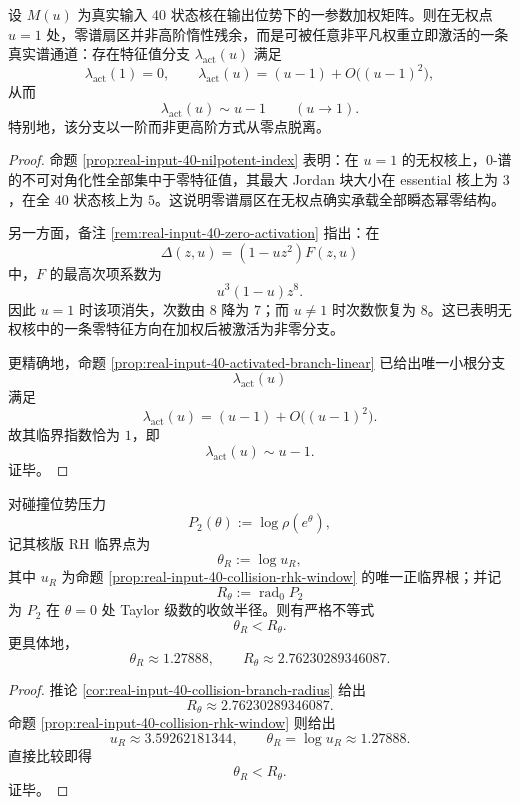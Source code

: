 \begin{theorem}[零谱扇区的一阶激活律]\label{thm:xi-time-part9zm-zero-sector-first-order-activation}
设 \(M(u)\) 为真实输入 \(40\) 状态核在输出位势下的一参数加权矩阵。则在无权点 \(u=1\) 处，零谱扇区并非高阶惰性残余，而是可被任意非平凡权重立即激活的一条真实谱通道：存在特征值分支 \(\lambda_{\mathrm{act}}(u)\) 满足
\[
\lambda_{\mathrm{act}}(1)=0,
\qquad
\lambda_{\mathrm{act}}(u)=(u-1)+O\!\bigl((u-1)^2\bigr),
\]
从而
\[
\lambda_{\mathrm{act}}(u)\sim u-1
\qquad (u\to 1).
\]
特别地，该分支以一阶而非更高阶方式从零点脱离。
\end{theorem}
\begin{proof}
命题 \ref{prop:real-input-40-nilpotent-index} 表明：在 \(u=1\) 的无权核上，\(0\)-谱的不可对角化性全部集中于零特征值，其最大 Jordan 块大小在 essential 核上为 \(3\)，在全 \(40\) 状态核上为 \(5\)。这说明零谱扇区在无权点确实承载全部瞬态幂零结构。

另一方面，备注 \ref{rem:real-input-40-zero-activation} 指出：在
\[
\Delta(z,u)=(1-uz^2)F(z,u)
\]
中，\(F\) 的最高次项系数为
\[
u^3(1-u)z^8.
\]
因此 \(u=1\) 时该项消失，次数由 \(8\) 降为 \(7\)；而 \(u\neq 1\) 时次数恢复为 \(8\)。这已表明无权核中的一条零特征方向在加权后被激活为非零分支。

更精确地，命题 \ref{prop:real-input-40-activated-branch-linear} 已给出唯一小根分支
\[
\lambda_{\mathrm{act}}(u)
\]
满足
\[
\lambda_{\mathrm{act}}(u)=(u-1)+O\!\bigl((u-1)^2\bigr).
\]
故其临界指数恰为 \(1\)，即
\[
\lambda_{\mathrm{act}}(u)\sim u-1.
\]
证毕。
\end{proof}

\begin{theorem}[RH 阈值先于解析障碍]\label{thm:xi-time-part9zm-rh-threshold-before-analytic-obstruction}
对碰撞位势压力
\[
P_2(\theta):=\log\rho(e^\theta),
\]
记其核版 RH 临界点为
\[
\theta_R:=\log u_R,
\]
其中 \(u_R\) 为命题 \ref{prop:real-input-40-collision-rhk-window} 的唯一正临界根；并记
\[
R_\theta:=\operatorname{rad}_0 P_2
\]
为 \(P_2\) 在 \(\theta=0\) 处 Taylor 级数的收敛半径。则有严格不等式
\[
\theta_R<R_\theta.
\]
更具体地，
\[
\theta_R\approx 1.27888,
\qquad
R_\theta\approx 2.76230289346087.
\]
\end{theorem}
\begin{proof}
推论 \ref{cor:real-input-40-collision-branch-radius} 给出
\[
R_\theta\approx 2.76230289346087.
\]
命题 \ref{prop:real-input-40-collision-rhk-window} 则给出
\[
u_R\approx 3.59262181344,
\qquad
\theta_R=\log u_R\approx 1.27888.
\]
直接比较即得
\[
\theta_R<R_\theta.
\]
证毕。
\end{proof}

